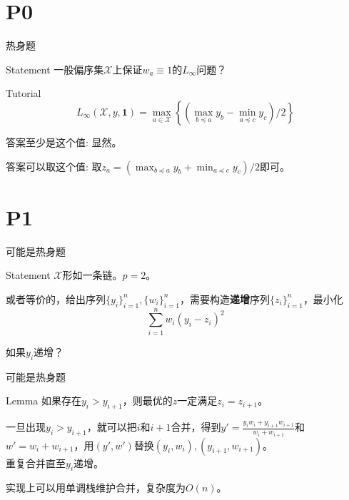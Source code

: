 \documentclass{beamer}
\begin{document}
\section{P0}
\begin{frame}{热身题}
\begin{block}{Statement}
	一般偏序集$\mathcal X$上保证$w_a \equiv 1$的$L_{\infty}$问题？
\end{block}\pause
\begin{block}{Tutorial}
	$$L_{\infty}(\mathcal X, y, \mathbf 1) = \max_{a \in \mathcal X}\left\{ \left(\max_{b \preceq a} y_b - \min_{a \preceq c} y_c\right) / 2\right\}$$\pause
	
	答案至少是这个值: 显然。\pause
	
	答案可以取这个值: 取$z_a = \left(\max_{b \preceq a} y_b + \min_{a \preceq c} y_c\right) / 2$即可。
\end{block}
\end{frame}
\fi
\section{P1}
\begin{frame}{可能是热身题}
\begin{block}{Statement}
	$\mathcal X$形如一条链。$p = 2$。
	
	或者等价的，给出序列$\{y_i\}_{i=1}^{n}, \{w_i\}_{i=1}^{n}$，需要构造\textbf{递增}序列$\{z_i\}_{i=1}^{n}$，最小化
	$$\sum_{i=1}^{n} w_i(y_i - z_i)^2$$
\end{block}
\pause
如果$y_i$递增？

\end{frame}

\begin{frame}{可能是热身题}
\begin{block}{Lemma}
	如果存在$y_i > y_{i+1}$，则最优的$z$一定满足$z_i = z_{i+1}$。	
\end{block}
\pause
一旦出现$y_i > y_{i+1}$，就可以把$i$和$i+1$合并，得到$y' = \frac{y_iw_i + y_{i+1}w_{i+1}}{w_i + w_{i+1}}$和$w' = w_i + w_{i+1}$，用$(y', w')$替换$(y_i, w_i), (y_{i+1}, w_{i+1})$。\\

重复合并直至$y_i$递增。\\\pause

实现上可以用单调栈维护合并，复杂度为$O(n)$。

\end{frame}
\end{document}

